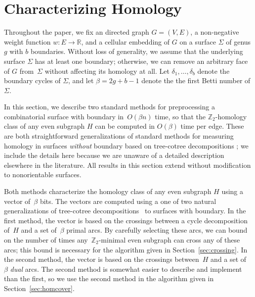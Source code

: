 \documentclass[11pt,twoside]{article}
\def\Z{\mathbb{Z}}
\def\Real{\mathbb{R}}
\begin{document}
\section{Characterizing Homology}
\label{S:tree-cotree}


Throughout the paper, we fix an  directed graph $G=(V,E)$, a non-negative weight function $w\colon E\to \Real$, and a cellular embedding of $G$ on a surface $\Sigma$ of genus $g$ with $b$ boundaries.
Without loss of generality, we assume that the underlying surface $\Sigma$ has at least one boundary; otherwise, we can remove an arbitrary face of $G$ from~$\Sigma$ without affecting its homology at all.  Let $\delta_1, \dots, \delta_b$ denote the boundary cycles of $\Sigma$, and let $\beta = 2g+b-1$ denote the the first Betti number of $\Sigma$.

In this section, we describe two standard methods for preprocessing a combinatorial surface with boundary in~$O(\beta n)$ time, so that the $\Z_2$-homology class of any even subgraph $H$ can be computed in $O(\beta)$ time per edge.  These are both straightforward generalizations of standard methods for measuring homology in surfaces \emph{without} boundary based on tree-cotree decompositions \cite{ew-gohhg-05, ccelw-scsih-08, e-dgteg-03}; we include the details here because we are unaware of a detailed description elsewhere in the literature.  All results in this section extend without modification to nonorientable surfaces.

Both methods characterize the homology class of any even subgraph $H$ using a vector of~$\beta$ bits.
The vectors are computed using a one of two natural generalizations of tree-cotree decompositions~\cite{e-dgteg-03} to surfaces with boundary.
In the first method, the vector is based on the crossings between a cycle decomposition of~$H$ and a set of~$\beta$ primal arcs.
By carefully selecting these arcs, we can bound on the number of times any~$\Z_2$-minimal even subgraph can cross any of these arcs; this bound is necessary for the algorithm given in Section~\ref{sec:crossing}.
In the second method, the vector is based on the crossings between~$H$ and a set of~$\beta$ \emph{dual} arcs.
The second method is somewhat easier to describe and implement than the first, so we use the second method in the algorithm given in Section~\ref{sec:homcover}.
\end{document}
